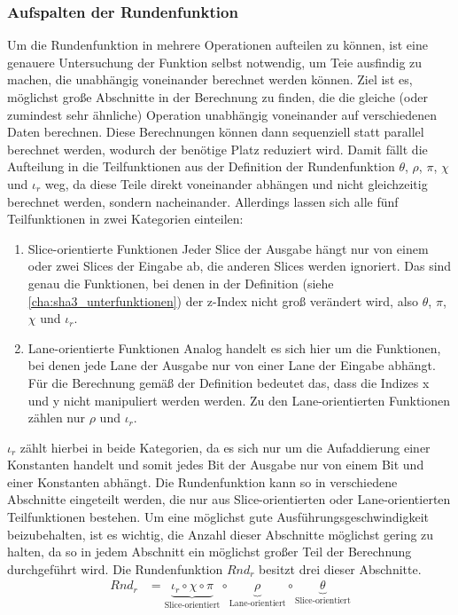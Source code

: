 \subsubsection{Aufspalten der Rundenfunktion}
\label{cha:iteration_1_modr}
Um die Rundenfunktion in mehrere Operationen aufteilen zu können, ist eine genauere Untersuchung der Funktion selbst notwendig, um Teie ausfindig zu machen,
die unabhängig voneinander berechnet werden können. Ziel ist es, möglichst große Abschnitte in der Berechnung zu finden, die die gleiche (oder zumindest sehr ähnliche)
Operation unabhängig voneinander auf verschiedenen Daten berechnen. Diese Berechnungen können dann sequenziell statt parallel berechnet werden,
wodurch der benötige Platz reduziert wird. Damit fällt die Aufteilung in die Teilfunktionen aus der Definition der Rundenfunktion $\theta$, $\rho$, $\pi$, $\chi$ und $\iota_r$
weg, da diese Teile direkt voneinander abhängen und nicht gleichzeitig berechnet werden, sondern nacheinander.
Allerdings lassen sich alle fünf Teilfunktionen in zwei Kategorien einteilen:
\begin{enumerate}
    \item Slice-orientierte Funktionen
        Jeder Slice der Ausgabe hängt nur von einem oder zwei Slices der Eingabe ab, die anderen Slices werden ignoriert. Das sind genau die Funktionen,
        bei denen in der Definition (siehe \ref{cha:sha3_unterfunktionen}) der z-Index nicht groß verändert wird, also $\theta$, $\pi$, $\chi$ und $\iota_r$.
    \item Lane-orientierte Funktionen
        Analog handelt es sich hier um die Funktionen, bei denen jede Lane der Ausgabe nur von einer Lane der Eingabe abhängt.
        Für die Berechnung gemäß der Definition bedeutet das, dass die Indizes x und y nicht manipuliert werden werden.
        Zu den Lane-orientierten Funktionen zählen nur $\rho$ und $\iota_r$.
\end{enumerate}
$\iota_r$ zählt hierbei in beide Kategorien, da es sich nur um die Aufaddierung einer Konstanten handelt und somit jedes Bit der Ausgabe nur von einem Bit und einer Konstanten abhängt.
Die Rundenfunktion kann so in verschiedene Abschnitte eingeteilt werden, die nur aus Slice-orientierten oder Lane-orientierten Teilfunktionen bestehen.
Um eine möglichst gute Ausführungsgeschwindigkeit beizubehalten, ist es wichtig, die Anzahl dieser Abschnitte möglichst gering zu halten,
da so in jedem Abschnitt ein möglichst großer Teil der Berechnung durchgeführt wird. Die Rundenfunktion $Rnd_r$ besitzt drei dieser Abschnitte.
\begin{align*}
    Rnd_r & = \underbrace{\iota_r \circ \chi \circ \pi}_\text{Slice-orientiert} \circ \underbrace{\rho}_\text{Lane-orientiert} \circ \underbrace{\theta}_\text{Slice-orientiert}
\end{align*}
